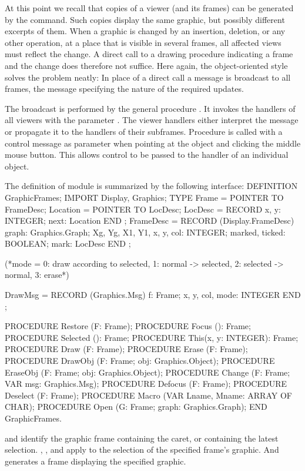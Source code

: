 At this point we recall that copies of a viewer (and its frames) can be generated by the  command. Such copies display the same graphic, but possibly different excerpts of them. When a graphic is changed by an insertion, deletion, or any other operation, at a place that is visible in several frames, all affected views must reflect the change. A direct call to a drawing procedure indicating a frame and the change does therefore not suffice. Here again, the object-oriented style solves the problem neatly: In place of a direct call a message is broadcast to all frames, the message specifying the nature of the required updates.

The broadcast is performed by the general procedure . It invokes the handlers of all viewers with the parameter . The viewer handlers either interpret the message or propagate it to the handlers of their subframes. Procedure  is called with a control message as parameter when pointing at the object and clicking the middle mouse button. This allows control to be passed to the handler of an individual object.

The definition of module  is summarized by the following interface:
\begintt
DEFINITION GraphicFrames;
  IMPORT Display, Graphics;
  TYPE Frame = POINTER TO FrameDesc;
    Location = POINTER TO LocDesc;
    LocDesc = RECORD
      x, y: INTEGER;
      next: Location
    END ;
  FrameDesc = RECORD (Display.FrameDesc)
    graph: Graphics.Graph;
    Xg, Yg, X1, Y1, x, y, col: INTEGER;
    marked, ticked: BOOLEAN;
    mark: LocDesc
  END ;
  
  (*mode = 0: draw according to selected,
    1: normal -> selected, 2: selected -> normal, 3: erase*)

  DrawMsg = RECORD (Graphics.Msg)
    f: Frame;
    x, y, col, mode: INTEGER
  END ;
  
  PROCEDURE Restore (F: Frame);
  PROCEDURE Focus (): Frame;
  PROCEDURE Selected (): Frame;
  PROCEDURE This(x, y: INTEGER): Frame;
  PROCEDURE Draw (F: Frame);
  PROCEDURE Erase (F: Frame);
  PROCEDURE DrawObj (F: Frame; obj: Graphics.Object);
  PROCEDURE EraseObj (F: Frame; obj: Graphics.Object);
  PROCEDURE Change (F: Frame; VAR msg: Graphics.Msg);
  PROCEDURE Defocus (F: Frame);
  PROCEDURE Deselect (F: Frame);
  PROCEDURE Macro (VAR Lname, Mname: ARRAY OF CHAR);
  PROCEDURE Open (G: Frame; graph: Graphics.Graph);
END GraphicFrames.
\endtt

 and  identify the graphic frame containing the caret, or containing the latest selection. , , and  apply to the selection of the specified frame's graphic. And  generates a frame displaying the specified graphic.

